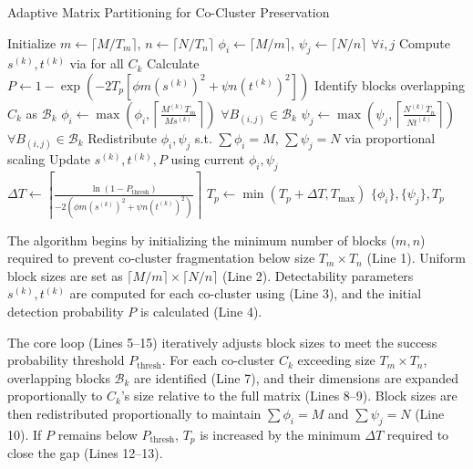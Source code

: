 \documentclass[journal]{IEEEtran}
\begin{document}
\begin{algorithm}[!t]
    \caption{Adaptive Matrix Partitioning for Co-Cluster Preservation}
    \label{alg:partitioning}
    \begin{algorithmic}[1]
        \STATE Initialize $m \gets \lceil M / T_m \rceil$, $n \gets \lceil N / T_n \rceil$ 
        \STATE $\phi_i \gets \lceil M/m \rceil$, $\psi_j \gets \lceil N/n \rceil$ $\forall i,j$ 
        \STATE Compute $s^{(k)}, t^{(k)}$ via  for all $C_k$
        \STATE Calculate $P \gets 1 - \exp\left( -2 T_p \left[ \phi m (s^{(k)})^2 + \psi n (t^{(k)})^2 \right] \right)$
        \STATE Identify blocks overlapping $C_k$ as $\mathcal{B}_k$
        \STATE $\phi_i \gets \max\left( \phi_i, \left\lceil \frac{M^{(k)} T_m}{M s^{(k)}} \right\rceil \right)$ $\forall B_{(i,j)} \in \mathcal{B}_k$
        \STATE $\psi_j \gets \max\left( \psi_j, \left\lceil \frac{N^{(k)} T_n}{N t^{(k)}} \right\rceil \right)$ $\forall B_{(i,j)} \in \mathcal{B}_k$
        \ENDFOR
        \STATE Redistribute $\phi_i, \psi_j$ s.t. $\sum \phi_i = M$, $\sum \psi_j = N$ via proportional scaling
        \STATE Update $s^{(k)}, t^{(k)}, P$ using current $\phi_i, \psi_j$
        \STATE $\Delta T \gets \left\lceil \frac{\ln(1 - P_{\text{thresh}})}{-2 \left( \phi m (s^{(k)})^2 + \psi n (t^{(k)})^2 \right)} \right\rceil$
        \STATE $T_p \gets \min(T_p + \Delta T, T_{\text{max}})$
        \ENDIF
        \ENDWHILE
        \RETURN $\{\phi_i\}, \{\psi_j\}, T_p$
    \end{algorithmic}
\end{algorithm}

The algorithm begins by initializing the minimum number of blocks ($m,n$) required to prevent co-cluster fragmentation below size $T_m \times T_n$ (Line 1). Uniform block sizes are set as $\lceil M/m \rceil \times \lceil N/n \rceil$ (Line 2). Detectability parameters $s^{(k)}, t^{(k)}$ are computed for each co-cluster using  (Line 3), and the initial detection probability $P$ is calculated (Line 4).

The core loop (Lines 5--15) iteratively adjusts block sizes to meet the success probability threshold $P_{\text{thresh}}$. For each co-cluster $C_k$ exceeding size $T_m \times T_n$, overlapping blocks $\mathcal{B}_k$ are identified (Line 7), and their dimensions are expanded proportionally to $C_k$'s size relative to the full matrix (Lines 8--9). Block sizes are then redistributed proportionally to maintain $\sum \phi_i = M$ and $\sum \psi_j = N$ (Line 10). If $P$ remains below $P_{\text{thresh}}$, $T_p$ is increased by the minimum $\Delta T$ required to close the gap (Lines 12--13).
\end{document}
